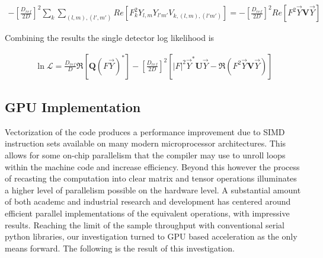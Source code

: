 \documentclass[paper=a4, fontsize=11pt]{scrartcl} %
\numberwithin{equation}{section} %
\numberwithin{figure}{section} %
\numberwithin{table}{section} %
\begin{document}
\begin{align}
- \left[\frac{D_{ref}}{2D}\right]^{2}\sum_{k}\sum_{(l,m),(l',m')}Re\left[  F_{k}^{2}Y_{l,m}Y_{l'm'}V_{k,(l,m),(l'm')}\right] = - \left[\frac{D_{ref}}{2D}\right]^{2}Re \left[F^2 \vec{Y}\mathbf{V}\vec{Y} \right]
\end{align}

Combining the results the single detector log likelihood is 

\begin{align}
\ln{\mathcal{L}} = \frac{D_{ref}}{D}\Re\left[\mathbf{Q}\left(F\vec{Y}\right)^{*}\right] - \left[\frac{D_{ref}}{2D}\right]^{2}\left[|F|^2 \vec{Y}^{*}\mathbf{U}\vec{Y} - \Re\left(F^2 \vec{Y}\mathbf{V}\vec{Y}\right) \right]
\end{align}

\subsection{GPU Implementation}
Vectorization of the code produces a performance improvement due to SIMD instruction sets available on many modern microprocessor architectures. This allows for some on-chip parallelism that the compiler may use to unroll loops within the machine code and increase efficiency. Beyond this however the process of recasting the computation into clear matrix and tensor operations illuminates a higher level of parallelism possible on the hardware level. A substantial amount of both academc and industrial research and development has centered around efficient parallel implementations of the equivalent operations, with impressive results. Reaching the limit of the sample throughput with conventional serial python libraries, our investigation turned to GPU based acceleration as the only means forward. The following is the result of this investigation.
\end{document}
